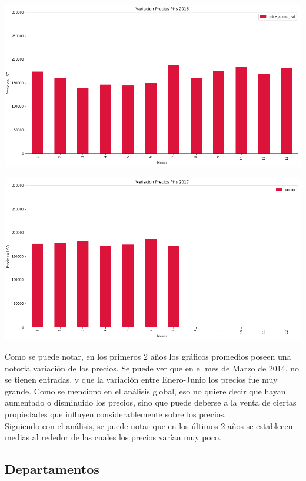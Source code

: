 \documentclass[a4paper, 10pt]{article}
\begin{document}
			\begin{center}
   		    		\includegraphics[width=\textwidth]{images/vPH2016}
			\end{center}			
			
			\begin{center}
   		    		\includegraphics[width=\textwidth]{images/vPH2017}
			\end{center}
			
			Como se puede notar, en los primeros 2 años los gráficos promedios poseen una notoria variación de los precios. Se puede ver que en el mes de Marzo de 2014, no se tienen entradas, y que la variación entre Enero-Junio los precios fue muy grande. Como se menciono en el análisis global, eso no quiere decir que hayan aumentado o disminuido los precios, sino que puede deberse a la venta de ciertas propiedades que influyen considerablemente sobre los precios.
			\\
			Siguiendo con el análisis, se puede notar que en los últimos 2 años se establecen medias al rededor de las cuales los precios varían muy poco.
			
			
			\subsection{Departamentos}
			
\end{document}
